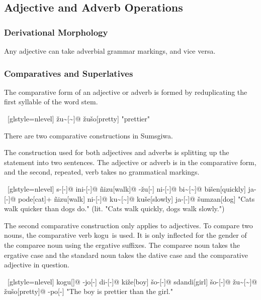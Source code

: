 \subsection{Adjective and Adverb Operations}

\subsubsection{Derivational Morphology}
Any adjective can take adverbial grammar markings, and vice versa.

\subsubsection{Comparatives and Superlatives}
The comparative form of an adjective or adverb is formed by reduplicating the first syllable of the word stem.

\ex~[glstyle=nlevel]
\begingl
\glpreamble {}
\endpreamble
\v{z}u\textasciitilde[{\Cmpr}\textasciitilde]@
\v{z}u\v{s}o[pretty]
\glft "prettier"
\endgl
\xe

There are two comparative constructions in Sumsgiwa.

The construction used for both adjectives and adverbs is splitting up the statement into two sentences. The adjective or adverb is in the comparative form, and the second, repeated, verb takes no grammatical markings.

\ex~[glstyle=nlevel]
\begingl
\glpreamble {}
\endpreamble
s-[{\Ind}-]@
ini-[{\Hab}-]@
ñizu[walk]@
-\v{z}u[-{\An}]
ni-[{\Hab}-]@
bi\textasciitilde[{\Cmpr}\textasciitilde]@
bi\v{s}en[quickly]
ja-[{\Nom}-]@
pode[cat]+
ñizu[walk]
ni-[{\Hab}-]@
ku\textasciitilde[{\Cmpr}\textasciitilde]@
ku\v{s}e[slowly]
ja-[{\Nom}-]@
\v{s}umzan[dog]
\glft "Cats walk quicker than dogs do." (lit. "Cats walk quickly, dogs walk slowly.")
\endgl
\xe

The second comparative construction only applies to adjectives. To compare two nouns, the comparative verb \textlangle kogu\textrangle~is used. It is only inflected for the gender of the comparee noun using the ergative suffixes. The comparee noun takes the ergative case and the standard noun takes the dative case and the comparative adjective in question.

\ex~[glstyle=nlevel]
\begingl
\glpreamble {}
\endpreamble
kogu[{\Comp}]@
-jo[-{\Hg}]
di-[{\Erg}-]@
ki\v{z}e[boy]
\v{s}o-[{\Dat}-]@
sdandi[girl]
\v{s}o-[{\Dat}-]@
\v{z}u\textasciitilde[{\Cmpr}\textasciitilde]@
\v{z}u\v{s}o[pretty]@
-po[-{\Hg}]
\glft "The boy is prettier than the girl."
\endgl
\xe
